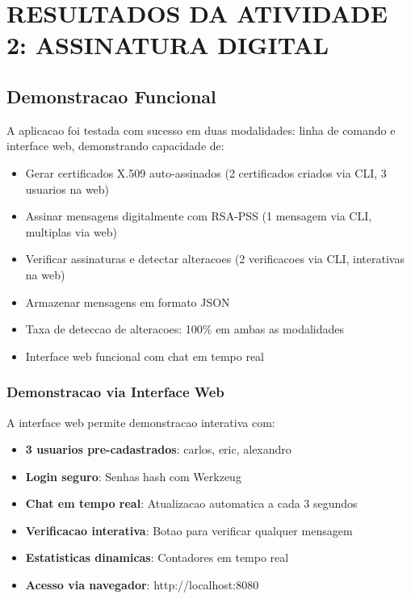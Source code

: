 \documentclass[12pt,a4paper,oneside]{article}
\begin{document}
\section{RESULTADOS DA ATIVIDADE 2: ASSINATURA DIGITAL}

\subsection{Demonstracao Funcional}

A aplicacao foi testada com sucesso em duas modalidades: linha de comando e interface web, demonstrando capacidade de:

\begin{itemize}
    \item Gerar certificados X.509 auto-assinados (2 certificados criados via CLI, 3 usuarios na web)
    \item Assinar mensagens digitalmente com RSA-PSS (1 mensagem via CLI, multiplas via web)
    \item Verificar assinaturas e detectar alteracoes (2 verificacoes via CLI, interativas na web)
    \item Armazenar mensagens em formato JSON
    \item Taxa de deteccao de alteracoes: 100\% em ambas as modalidades
    \item Interface web funcional com chat em tempo real
\end{itemize}

\subsubsection{Demonstracao via Interface Web}

A interface web permite demonstracao interativa com:

\begin{itemize}
    \item \textbf{3 usuarios pre-cadastrados}: carlos, eric, alexandro
    \item \textbf{Login seguro}: Senhas hash com Werkzeug
    \item \textbf{Chat em tempo real}: Atualizacao automatica a cada 3 segundos
    \item \textbf{Verificacao interativa}: Botao para verificar qualquer mensagem
    \item \textbf{Estatisticas dinamicas}: Contadores em tempo real
    \item \textbf{Acesso via navegador}: http://localhost:8080
\end{itemize}
\end{document}
